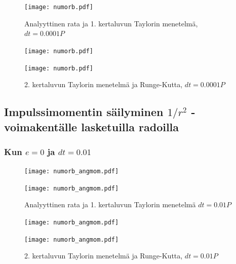 \documentclass[12pt, a4paper]{article}
\begin{document}
\begin{figure}[H]%
\vspace*{-2.5cm}
\texttt{[image: numorb.pdf]}%
\caption{Analyyttinen rata ja 1. kertaluvun Taylorin menetelmä, $dt=0.0001P$}
\end{figure}

\newpage
\begin{figure}[H]%
\texttt{[image: numorb.pdf]}%
\end{figure}

\begin{figure}[H]%
\vspace*{-2.5cm}
\texttt{[image: numorb.pdf]}%
\caption{2. kertaluvun Taylorin menetelmä ja Runge-Kutta, $dt=0.0001P$}
\end{figure}



\newpage
\subsection{Impulssimomentin säilyminen $1/r^2$ -voimakentälle lasketuilla radoilla}\label{impulssi}

\newpage
\subsubsection{Kun $e=0$ ja $dt=0.01$}
\begin{figure}[H]%
\vspace*{-1cm}
\texttt{[image: numorb\_angmom.pdf]}%
\end{figure}

\begin{figure}[H]%
\vspace*{-2cm}
\texttt{[image: numorb\_angmom.pdf]}%
\caption{Analyyttinen rata ja 1. kertaluvun Taylorin menetelmä $dt=0.01P$}
\end{figure}

\newpage
\begin{figure}[H]%
\texttt{[image: numorb\_angmom.pdf]}%
\end{figure}

\begin{figure}[H]%
\vspace*{-2cm}
\texttt{[image: numorb\_angmom.pdf]}%
\caption{2. kertaluvun Taylorin menetelmä ja Runge-Kutta, $dt=0.01P$}
\end{figure}
\end{document}
